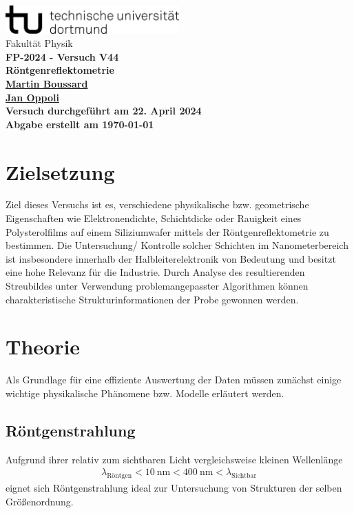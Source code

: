 \documentclass[12pt]{article}
\begin{document}
\begin{titlepage}
  \centering
  \vspace*{1cm}
  \includegraphics[width=0.5\textwidth]{Ressourcen/tud_logo_schwarz(RGB)}\\
  \vspace*{0.25cm}
  \large\textmd{Fakultät Physik} \\
  \vspace*{6cm}
  \huge \bfseries FP-2024 - Versuch V44\\
  \vspace*{0.25cm}
  \large Röntgenreflektometrie\\
  \vspace*{0.25cm}
  \large\textmd{\href{mailto:martin.boussard@tu-dortmund.de}{Martin Boussard}} \\
  \large\textmd{\href{mailto:jan.oppoli@tu-dortmund.de}{Jan Oppoli}} \\
  \vfill
  \small\textmd{Versuch durchgeführt am 22. April 2024}\\
  \small\textmd{Abgabe erstellt am \today}
\end{titlepage}
\tableofcontents 
\newpage

\section{Zielsetzung}\label{sec:zielsetzung}
Ziel dieses Versuchs ist es, verschiedene physikalische bzw. geometrische Eigenschaften wie Elektronendichte, Schichtdicke oder Rauigkeit eines Polysterolfilms auf einem Siliziumwafer mittels der Röntgenreflektometrie zu bestimmen.
Die Untersuchung/ Kontrolle solcher Schichten im Nanometerbereich ist insbesondere innerhalb der Halbleiterelektronik von Bedeutung und besitzt eine hohe Relevanz für die Industrie.
Durch Analyse des resultierenden Streubildes unter Verwendung problemangepasster Algorithmen können charakteristische Strukturinformationen der Probe gewonnen werden.
\section{Theorie}\label{sec:theorie}
Als Grundlage für eine effiziente Auswertung der Daten müssen zunächst einige wichtige physikalische Phänomene bzw. Modelle erläutert werden.
\subsection{Röntgenstrahlung}\label{subsec:röntgen}
Aufgrund ihrer relativ zum sichtbaren Licht vergleichsweise kleinen Wellenlänge 
\begin{align*}
  \lambda_{\text{Röntgen}} < \SI{10}{\nano\meter} < \SI{400}{\nano\meter} <\lambda_\text{Sichtbar}
\end{align*}
eignet sich Röntgenstrahlung ideal zur Untersuchung von Strukturen der selben Größenordnung.
\end{document}
